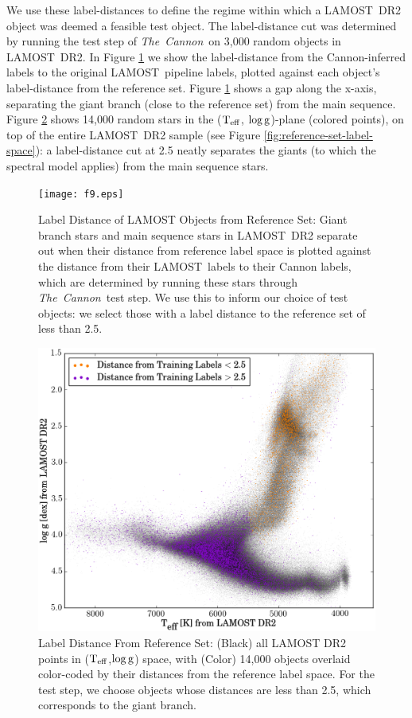 \documentclass[12pt, letterpaper, preprint]{aastex}
\newcommand{\tc}{\textsl{The~Cannon}}
\newcommand{\lamost}{LAMOST}
\newcommand{\teff}{\mbox{$\rm T_{eff}$}}
\newcommand{\logg}{\mbox{$\rm \log g$}}
\begin{document}
We use these label-distances to define the regime within which a
\lamost\ DR2 object was deemed a feasible test object. 
The label-distance cut was determined by running the test step of \tc\ on 3,000 random objects in \lamost\ DR2. 
In Figure \ref{fig:ts-dist} we show the label-distance from the Cannon-inferred labels to the original \lamost\ pipeline labels, 
plotted against each object's label-distance from the reference set. Figure \ref{fig:ts-dist} shows a gap along the x-axis, separating the giant branch (close to the reference set) from the main sequence. Figure \ref{fig:ts-dist-dr2} shows 14,000 random stars in the 
(\teff, \logg)-plane (colored points), on top of the entire \lamost\ DR2 sample (see Figure \ref{fig:reference-set-label-space}): a label-distance cut at 2.5 neatly separates the giants (to which the spectral model applies) from the main sequence stars.

\begin{figure}[!p]
\centering
\texttt{[image: f9.eps]}
\caption{Label Distance of LAMOST Objects from Reference Set: Giant branch stars and main sequence stars in \lamost\ DR2 separate out when their distance from reference label space is plotted against the distance from their \lamost\ labels to their Cannon labels, which are determined by running these stars through \tc\ test step.
We use this to inform our choice of test objects: we select those
with a label distance to the reference set of less than 2.5.}
\label{fig:ts-dist}
\end{figure}

\begin{figure}[H]
\centering
\includegraphics[scale=0.7]{f10.eps}
\caption{Label Distance From Reference Set: (Black) all LAMOST DR2 points in (\teff,\logg) space, with (Color) 14,000 objects overlaid color-coded by their distances from the reference label space. For the test step, we choose objects whose distances are less than 2.5,
which corresponds to the giant branch.}
\label{fig:ts-dist-dr2}
\end{figure}
\end{document}
